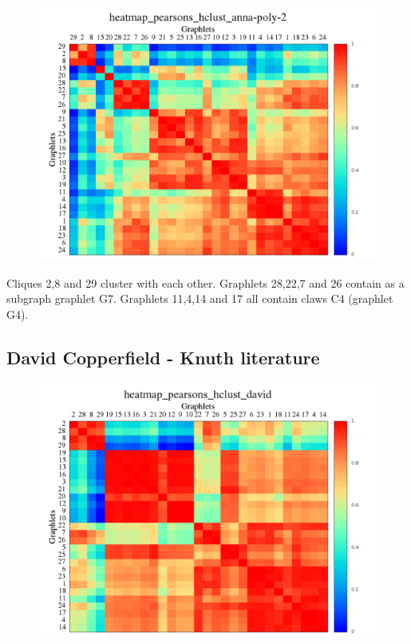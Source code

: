 \documentclass[11pt,a4paper,oneside]{report}
\begin{document}
\begin{figure}[H]
  \centering
\includegraphics[scale=0.4]
{../code/final_results/knuth_literature/anna/heatmap_pearsons_hclust_anna-poly-2.png}
\caption{}
\label{fig:anna-knuth}
\end{figure}

Cliques 2,8 and 29 cluster with each other. Graphlets 28,22,7 and 26 contain as a subgraph graphlet G7. Graphlets 11,4,14 and 17 all contain claws C4 (graphlet G4).

\subsection*{David Copperfield - Knuth literature}

\begin{figure}[H]
  \centering
\includegraphics[scale=0.4]
{../code/final_results/knuth_literature/david/heatmap_pearsons_hclust_david.png}
\caption{}
\label{fig:anna-knuth}
\end{figure}
\end{document}
